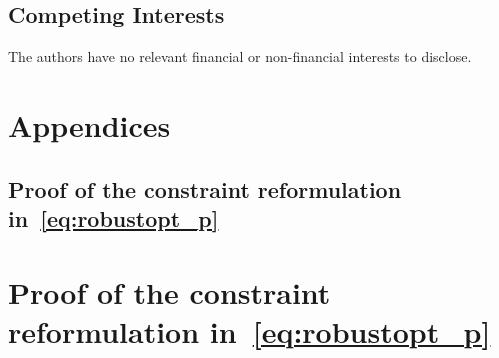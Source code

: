 \documentclass[12pt]{article}
\theoremstyle{thmstyleone}%
\theoremstyle{thmstyletwo}%
\theoremstyle{thmstylethree}%
\begin{document}
\subsection*{Competing Interests}
The authors have no relevant financial or non-financial interests to disclose.

\fi








\ifpreprint
\appendix
\section{Appendices}
\else
\begin{appendices}
\fi


\ifpreprint
\subsection{Proof of the constraint reformulation in~\eqref{eq:robustopt_p}}
\else
\section{Proof of the constraint reformulation in~\eqref{eq:robustopt_p}}
\fi


\end{appendices}
\end{document}
